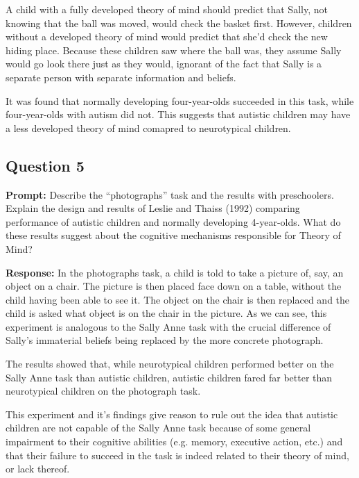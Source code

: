 \documentclass{article}
\begin{document}
A child with a fully developed theory of mind should predict that Sally, not knowing that the ball was moved, would check the basket first. However, children without a developed theory of mind would predict that she'd check the new hiding place. Because these children saw where the ball was, they assume Sally would go look there just as they would, ignorant of the fact that Sally is a separate person with separate information and beliefs.

It was found that normally developing four-year-olds succeeded in this task, while four-year-olds with autism did not. This suggests that autistic children may have a less developed theory of mind comapred to neurotypical children.

\subsection*{Question 5}
\noindent\textbf{Prompt:} Describe the ``photographs'' task and the results with preschoolers. Explain the design and results of Leslie and Thaiss (1992) comparing performance of autistic children and normally developing 4-year-olds. What do these results suggest about the cognitive mechanisms responsible for Theory of Mind?
\bigskip

\noindent\textbf{Response:} In the photographs task, a child is told to take a picture of, say, an object on a chair. The picture is then placed face down on a table, without the child having been able to see it. The object on the chair is then replaced and the child is asked what object is on the chair in the picture. As we can see, this experiment is analogous to the Sally Anne task with the crucial difference of Sally's immaterial beliefs being replaced by the more concrete photograph.

The results showed that, while neurotypical children performed better on the Sally Anne task than autistic children, autistic children fared far better than neurotypical children on the photograph task.

This experiment and it's findings give reason to rule out the idea that autistic children are not capable of the Sally Anne task because of some general impairment to their cognitive abilities (e.g. memory, executive action, etc.) and that their failure to succeed in the task is indeed related to their theory of mind, or lack thereof.
\end{document}
